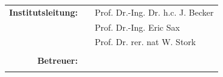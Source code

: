 \begin{titlepage}
\begin{minipage}{15cm}
\begin{center}
\vspace{1cm}
\Large
\textbf{\abgabe}
\end{center}
%
\vspace{2.5cm}

\begin{tabular}{rcl}
\bfseries Institutsleitung: 
&& Prof. Dr.-Ing. Dr. h.c. J. Becker\\
&& Prof. Dr.-Ing. Eric Sax\\
&& Prof. Dr. rer. nat  W. Stork\\

 \\
	\bfseries Betreuer:       &&\nameprefix  \betreuerA \\
											      && \nameprefixb  \betreuerB \\
\end{tabular}											
\end{minipage}
\end{titlepage}